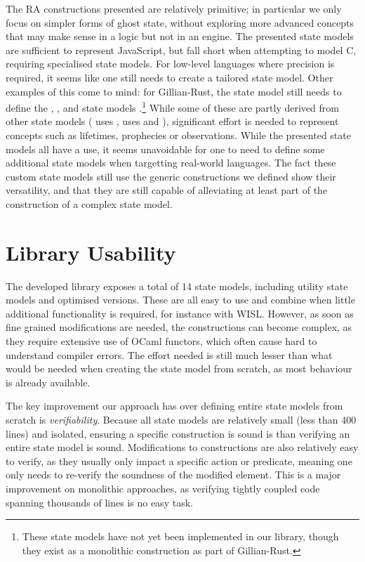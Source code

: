 The RA constructions presented are relatively primitive; in particular we only focus on simpler forms of ghost state, without exploring more advanced concepts that may make sense in a logic but not in an engine. The presented state models are sufficient to represent JavaScript, but fall short when attempting to model C, requiring specialised state models. For low-level languages where precision is required, it seems like one still needs to create a tailored state model. Other examples of this come to mind: for Gillian-Rust, the state model still needs to define the , ,  and  state models \cite{gillianrust,sacha-phd}.\footnote{These state models have not yet been implemented in our library, though they exist as a monolithic construction as part of Gillian-Rust.} While some of these are partly derived from other state models ( uses \PMap,  uses \PMap{} and \Frac{}), significant effort is needed to represent concepts such as lifetimes, prophecies or observations. While the presented state models all have a use, it seems unavoidable for one to need to define some additional state models when targetting real-world languages. The fact these custom state models still use the generic constructions we defined show their versatility, and that they are still capable of alleviating at least part of the construction of a complex state model.

\section{Library Usability} \label{sec:usability-library}

The developed library exposes a total of 14 state models, including utility state models and optimised versions. These are all easy to use and combine when little additional functionality is required, for instance with WISL. However, as soon as fine grained modifications are needed, the constructions can become complex, as they require extensive use of OCaml functors, which often cause hard to understand compiler errors. The effort needed is still much lesser than what would be needed when creating the state model from scratch, as most behaviour is already available.

The key improvement our approach has over defining entire state models from scratch is \emph{verifiability}. Because all state models are relatively small (less than 400 lines) and isolated, ensuring a specific construction is sound is  than verifying an entire state model is sound. Modifications to constructions are also relatively easy to verify, as they usually only impact a specific action or predicate, meaning one only needs to re-verify the soundness of the modified element. This is a major improvement on monolithic approaches, as verifying tightly coupled code spanning thousands of lines is no easy task.

